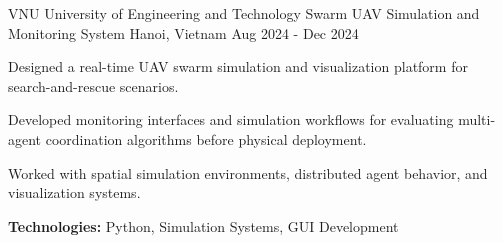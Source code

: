\begin{cventries}
\cventry
    {VNU University of Engineering and Technology}
    {Swarm UAV Simulation and Monitoring System}
    {Hanoi, Vietnam}
    {Aug 2024 - Dec 2024}
    {
      \begin{cvitems}
        \item {Designed a real-time UAV swarm simulation and visualization platform for search-and-rescue scenarios.}
        \item {Developed monitoring interfaces and simulation workflows for evaluating multi-agent coordination algorithms before physical deployment.}
        \item {Worked with spatial simulation environments, distributed agent behavior, and visualization systems.}
        \item {\textbf{Technologies:} Python, Simulation Systems, GUI Development}
      \end{cvitems}
    }
    
\end{cventries}